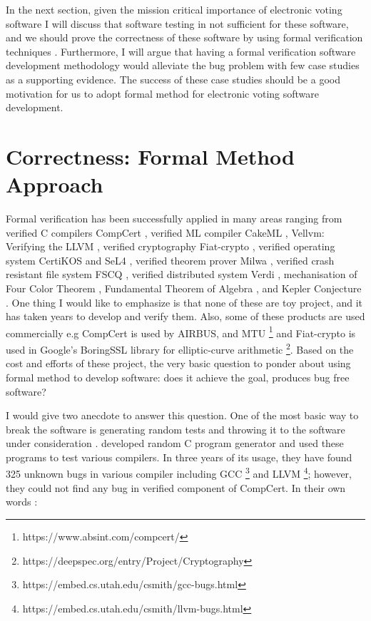    In the next section, given the mission critical importance of electronic voting software 
   I will discuss that software testing 
   in not sufficient for these software, and we should 
   prove the  correctness of these software
   by using formal verification techniques \citep{BECKERT2014115}.
   Furthermore, I will argue that  having a formal verification software development methodology would alleviate 
	the bug problem with few case studies as a supporting evidence. The success of these 
	case studies should be a good motivation for us to 
	adopt formal method for electronic voting software development. 
   
   
   \section{Correctness: Formal Method Approach}
   \label{sec:correctness_formal}

	Formal verification has been successfully applied in many areas ranging 
	from verified C compilers CompCert \citep{DBLP:conf/popl/Leroy06}, verified ML compiler
	CakeML \citep{Kumar:2014:CVI}, Vellvm: Verifying the LLVM 
	\citep{10.1007/978-3-642-35308-6_6}, verified cryptography 
	Fiat-crypto \citep{DBLP:conf/sp/ErbsenPGSC19}, verified 
	operating system CertiKOS \citep{DBLP:conf/apsys/GuVFSC11} and 
	SeL4 \citep{DBLP:conf/sosp/KleinEHACDEEKNSTW09}, verified theorem 
	prover Milwa \citep{DBLP:conf/itp/MyreenD14}, 
	verified crash resistant file system FSCQ \citep{Chen:2015:UCH:2815400.2815402}, 
	verified distributed system 
	Verdi \citep{DBLP:conf/pldi/WilcoxWPTWEA15}, mechanisation of 
	Four Color Theorem \citep{10.1007/978-3-540-87827-8_28}, 
	Fundamental Theorem of 
	Algebra \citep{10.1007/3-540-45842-5_7}, and Kepler Conjecture \citep{hales-kepler}.
	One thing I would like to emphasize 
	is that none of these are toy project, and it has taken years 
	to develop and verify them. Also, some of these products 
	are used commercially e.g CompCert is used by AIRBUS, and MTU
	\footnote{https://www.absint.com/compcert/} and Fiat-crypto is used 
	in Google's BoringSSL library for elliptic-curve arithmetic 
	\footnote{https://deepspec.org/entry/Project/Cryptography}. 
	Based on the cost and efforts of these project, 
	the very basic question to ponder about using formal method to develop 
	software:  does it achieve the goal, produces bug free software?
	
	
	I would give two anecdote to answer this question. 
	One of the most basic way to 
	break the software is generating random tests and throwing it to 
	the software under consideration \citep{Miller:1990:ESR:96267.96279}.
	\citep{Yang:2011:FUB:1993316.1993532} developed random 
	C program generator and used these programs to test various 
	compilers. In three years of its usage, they have found 325 unknown
	bugs in various compiler including GCC
	\footnote{https://embed.cs.utah.edu/csmith/gcc-bugs.html} and LLVM
	\footnote{https://embed.cs.utah.edu/csmith/llvm-bugs.html}; however, 
	they could not find any bug in verified component of CompCert. 
	In their own words \citep{Yang:2011:FUB:1993316.1993532}:
	

